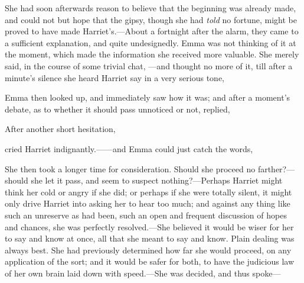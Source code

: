 She had soon afterwards reason to believe that the beginning was already made, and could not but hope that the gipsy, though she had {\em told} no fortune, might be proved to have made Harriet's.---About a fortnight after the alarm, they came to a sufficient explanation, and quite undesignedly. Emma was not thinking of it at the moment, which made the information she received more valuable. She merely said, in the course of some trivial chat, ---and thought no more of it, till after a minute's silence she heard Harriet say in a very serious tone, 

Emma then looked up, and immediately saw how it was; and after a moment's debate, as to whether it should pass unnoticed or not, replied,



After another short hesitation, 

 cried Harriet indignantly.------and Emma could just catch the words, 

She then took a longer time for consideration. Should she proceed no farther?---should she let it pass, and seem to suspect nothing?---Perhaps Harriet might think her cold or angry if she did; or perhaps if she were totally silent, it might only drive Harriet into asking her to hear too much; and against any thing like such an unreserve as had been, such an open and frequent discussion of hopes and chances, she was perfectly resolved.---She believed it would be wiser for her to say and know at once, all that she meant to say and know. Plain dealing was always best. She had previously determined how far she would proceed, on any application of the sort; and it would be safer for both, to have the judicious law of her own brain laid down with speed.---She was decided, and thus spoke---



